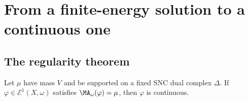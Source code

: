 \section{From a finite-energy solution to a continuous one}
\label{sec:ch29-regularity}

\subsection{The regularity theorem}
\label{sec:ch29-regularity-theorem}

\begin{theorem}\label{thm:bfj-supported-regularity}
Let $\mu$ have mass $V$ and be supported on a fixed SNC dual complex
$\Delta$.  If $\varphi\in\mathcal E^1(X,\omega)$ satisfies
$\MA_\omega(\varphi)=\mu$, then $\varphi$ is continuous.
\end{theorem}

